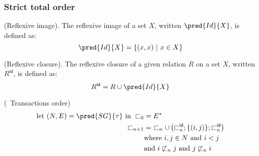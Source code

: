 \subsubsection{Strict total order}

\begin{defn}
	(Reflexive image).
	The reflexive image of a set $X$, written $\pred{Id}{X}$, is defined as:
	\[
		\pred{Id}{X} = \{ (x, x)\ |\ x \in X \}
	\]
\end{defn}

\begin{defn}
	(Reflexive closure).
	The reflexive closure of a given relation $R$ on a set $X$, written $R^\mathsf{id}$, is defined as:
	\[
		R^\mathsf{id} = R \cup \pred{Id}{X}
	\]
\end{defn}

\begin{defn}
	(\tpl\ Transactions order)
	\begin{align*}
		\text{let } (N, E) = \pred{SG}{\tau} \text{ in }
		\sqsubset_0 &= E^* \\
		\sqsubset_{n + 1} &=\ \sqsubset_n \cup \left( \sqsubset_n^\mathsf{id} ; \{ (i, j) \} ; \sqsubset_n^\mathsf{id} \right) \\
		&\text{where } i, j \in N \text{ and } i < j \\
		&\text{and } i \not\sqsubset_n j \text{ and } j \not\sqsubset_n i
	\end{align*}
\end{defn}

